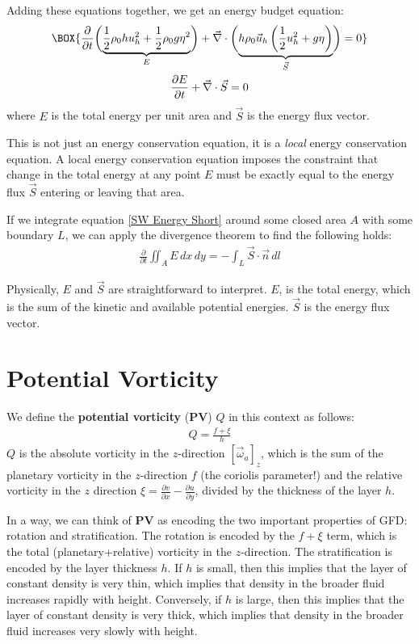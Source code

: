 Adding these equations together, we get an energy budget equation:
\begin{gather}
    \label{SW Energy}
    \BOX{
        \frac{\partial}{\partial t}\biggl( \underbrace{\frac{1}{2}\rho_0 h u_h^2 + \frac{1}{2}\rho_0 g \eta^2}_{E} \biggr)
        +
        \vec{\nabla}\cdot\biggl( 
            \underbrace{h\rho_0\vec{u}_h \left( \frac{1}{2}u_h^2+g\eta \right)}_{\vec{S}}
         \biggr)
        =0
    }\\
    \label{SW Energy Short}
    \frac{\partial E}{\partial t}+\vec{\nabla}\cdot\vec{S}=0
\end{gather}
where \(E\) is the total energy per unit area and \(\vec{S}\) is the energy flux vector. 

This is not just an energy conservation equation, it is a \textit{local} energy conservation equation. A local energy conservation equation imposes the constraint that change in the total energy at any point \(E\) must be exactly equal to the energy flux \(\vec{S}\) entering or leaving that area.

If we integrate equation \ref{SW Energy Short} around some closed area \(A\) with some boundary \(L\), we can apply the divergence theorem to find the following holds:
\begin{align*}
    \frac{\partial}{\partial t}\iint_A E \,dx\,dy = -\int_L \vec{S}\cdot\vec{n}\,dl
\end{align*}

Physically, \(E\) and \(\vec{S}\) are straightforward to interpret. \(E\), is the total energy, which is the sum of the kinetic and available potential energies. \(\vec{S}\) is the energy flux vector.

\section{Potential Vorticity}\label{PV}

We define the \textbf{potential vorticity} (\textbf{PV}) \(Q\) in this context as follows:
\begin{align*}
    \boxed{Q = \frac{f+\xi}{h}}
\end{align*}
\(Q\) is the absolute vorticity in the \(z\)-direction \([\vec{\omega}_a]_z\), which is the sum of the planetary vorticity in the \(z\)-direction \(f\) (the coriolis parameter!) and the relative vorticity in the \(z\) direction \(\xi=\frac{\partial v}{\partial x}-\frac{\partial u}{\partial y}\), divided by the thickness of the layer \(h\).

In a way, we can think of \textbf{PV} as encoding the two important properties of GFD: rotation and stratification. The rotation is encoded by the \(f+\xi\) term, which is the total (planetary+relative) vorticity in the \(z\)-direction. The stratification is encoded by the layer thickness \(h\). If \(h\) is small, then this implies that the layer of constant density is very thin, which implies that density in the broader fluid increases rapidly with height. Conversely, if \(h\) is large, then this implies that the layer of constant density is very thick, which implies that density in the broader fluid increases very slowly with height.

